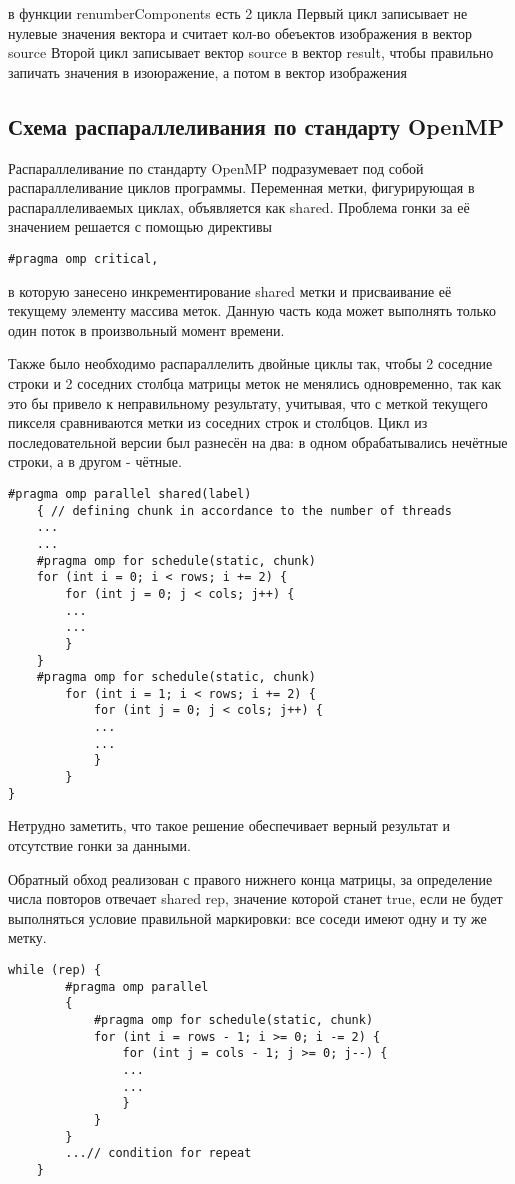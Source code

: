 \documentclass{report}
\begin{document}
в функции renumberComponents есть 2 цикла
Первый цикл записывает не нулевые значения вектора и считает кол-во обеъектов изображения в вектор source
Второй цикл записывает вектор source в вектор result, чтобы правильно запичать значения в изоюражение, а потом в вектор изображения

\subsection{Схема распараллеливания по стандарту OpenMP}
Распараллеливание по стандарту OpenMP подразумевает под собой распараллеливание циклов программы. Переменная метки, фигурирующая в распараллеливаемых циклах, объявляется как shared. Проблема гонки за её значением решается с помощью директивы 
\begin{lstlisting}
#pragma omp critical,
\end{lstlisting}
в которую занесено инкрементирование shared метки и присваивание её текущему элементу массива меток. Данную часть кода может выполнять только один поток в произвольный момент времени.
\par Также было необходимо распараллелить двойные циклы так, чтобы 2 соседние строки и 2 соседних столбца матрицы меток не менялись одновременно, так как это бы привело к неправильному результату, учитывая, что с меткой текущего пикселя сравниваются метки из соседних строк и столбцов. Цикл из последовательной версии был разнесён на два: в одном обрабатывались нечётные строки, а в другом - чётные. 
\begin{lstlisting}
#pragma omp parallel shared(label)
    { // defining chunk in accordance to the number of threads
    ...
    ...
    #pragma omp for schedule(static, chunk)
    for (int i = 0; i < rows; i += 2) {
        for (int j = 0; j < cols; j++) {
        ...
        ...
        }
    }
    #pragma omp for schedule(static, chunk)
        for (int i = 1; i < rows; i += 2) {
            for (int j = 0; j < cols; j++) { 
            ...
            ...
            }
        }
}
\end{lstlisting}
Нетрудно заметить, что такое решение обеспечивает верный результат и отсутствие гонки за данными.
\par Обратный обход реализован с правого нижнего конца матрицы, за определение числа повторов отвечает shared rep, значение которой станет true, если не будет выполняться условие правильной маркировки: все соседи имеют одну и ту же метку.
\begin{lstlisting}
while (rep) {
        #pragma omp parallel
        {
            #pragma omp for schedule(static, chunk)
            for (int i = rows - 1; i >= 0; i -= 2) {
                for (int j = cols - 1; j >= 0; j--) {
                ...
                ...
                }
            }
        }
        ...// condition for repeat
    }
\end{lstlisting}
\end{document}
